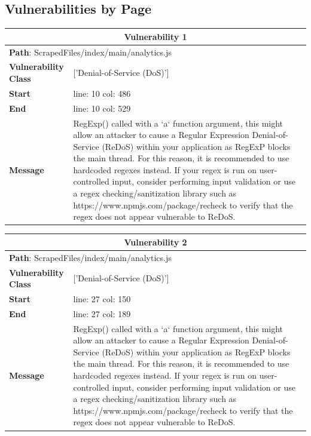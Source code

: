 \documentclass[12pt]{article}
\begin{document}
\subsection{Vulnerabilities by Page}
\begin{table}[!h]
\centering
\renewcommand{\arraystretch}{1.3}
\begin{tabular}{|l|p{10cm}|}
\hline
\multicolumn{2}{|c|}{\textbf{Vulnerability 1}} \\
\hline
\multicolumn{2}{|l|}{\textbf{Path}: ScrapedFiles/index/main/analytics.js} \\
\hline
\textbf{Vulnerability Class} & ['Denial-of-Service (DoS)'] \\
\hline
\textbf{Start} & line: 10 \quad col: 486 \\
\hline
\textbf{End} & line: 10 \quad col: 529 \\
\hline
\textbf{Message} & RegExp() called with a `a` function argument, this might allow an attacker to cause a Regular Expression Denial-of-Service (ReDoS) within your application as RegExP blocks the main thread. For this reason, it is recommended to use hardcoded regexes instead. If your regex is run on user-controlled input, consider performing input validation or use a regex checking/sanitization library such as https://www.npmjs.com/package/recheck to verify that the regex does not appear vulnerable to ReDoS. \\
\hline
\end{tabular}
\end{table}
\vspace{0.7cm}
\FloatBarrier
\begin{table}[!h]
\centering
\renewcommand{\arraystretch}{1.3}
\begin{tabular}{|l|p{10cm}|}
\hline
\multicolumn{2}{|c|}{\textbf{Vulnerability 2}} \\
\hline
\multicolumn{2}{|l|}{\textbf{Path}: ScrapedFiles/index/main/analytics.js} \\
\hline
\textbf{Vulnerability Class} & ['Denial-of-Service (DoS)'] \\
\hline
\textbf{Start} & line: 27 \quad col: 150 \\
\hline
\textbf{End} & line: 27 \quad col: 189 \\
\hline
\textbf{Message} & RegExp() called with a `a` function argument, this might allow an attacker to cause a Regular Expression Denial-of-Service (ReDoS) within your application as RegExP blocks the main thread. For this reason, it is recommended to use hardcoded regexes instead. If your regex is run on user-controlled input, consider performing input validation or use a regex checking/sanitization library such as https://www.npmjs.com/package/recheck to verify that the regex does not appear vulnerable to ReDoS. \\
\hline
\end{tabular}
\end{table}
\end{document}
